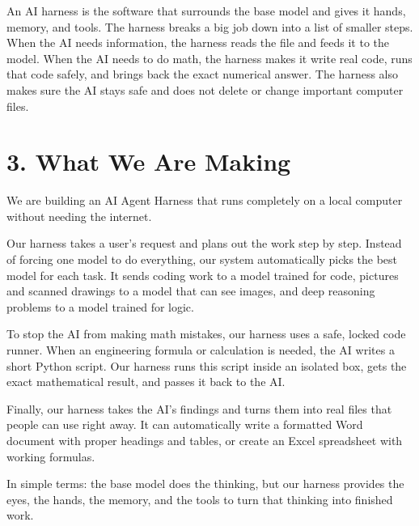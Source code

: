 \documentclass[11pt,a4paper]{article}
\begin{document}
An AI harness is the software that surrounds the base model and gives it hands, memory, and tools. The harness breaks a big job down into a list of smaller steps. When the AI needs information, the harness reads the file and feeds it to the model. When the AI needs to do math, the harness makes it write real code, runs that code safely, and brings back the exact numerical answer. The harness also makes sure the AI stays safe and does not delete or change important computer files.

\section*{3. What We Are Making}

We are building an AI Agent Harness that runs completely on a local computer without needing the internet.

Our harness takes a user's request and plans out the work step by step. Instead of forcing one model to do everything, our system automatically picks the best model for each task. It sends coding work to a model trained for code, pictures and scanned drawings to a model that can see images, and deep reasoning problems to a model trained for logic.

To stop the AI from making math mistakes, our harness uses a safe, locked code runner. When an engineering formula or calculation is needed, the AI writes a short Python script. Our harness runs this script inside an isolated box, gets the exact mathematical result, and passes it back to the AI.

Finally, our harness takes the AI's findings and turns them into real files that people can use right away. It can automatically write a formatted Word document with proper headings and tables, or create an Excel spreadsheet with working formulas.

In simple terms: the base model does the thinking, but our harness provides the eyes, the hands, the memory, and the tools to turn that thinking into finished work.
\end{document}
